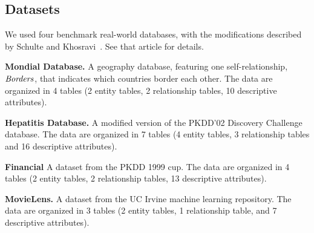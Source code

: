 \documentclass[oribibl]{llncs}
\begin{document}
\subsection{Datasets} 

We used %
four benchmark real-world databases, with the modifications described by Schulte and Khosravi~\cite{Schulte2012}. See that article for details.  %



\noindent\textbf{Mondial Database.} A geography database, featuring
one self-relationship, $\it{Borders}$, that indicates which countries border each other. The data are organized in 4 tables (2 entity tables, 2 relationship tables, 10 descriptive attributes).

\noindent\textbf{Hepatitis Database.} A modified version of the PKDD'02 Discovery Challenge database. The data are organized in 7 tables (4 entity tables, 3 relationship tables and 16 descriptive attributes).

\noindent\textbf{Financial} A dataset from the PKDD 1999 cup. The data are organized in 4 tables (2 entity tables, 2 relationship tables, 13 descriptive attributes).

\noindent\textbf{MovieLens.} A dataset from the UC Irvine machine learning repository. The data are organized in 3 tables (2 entity tables, 1 relationship table, and 7 descriptive attributes). 
\end{document}
